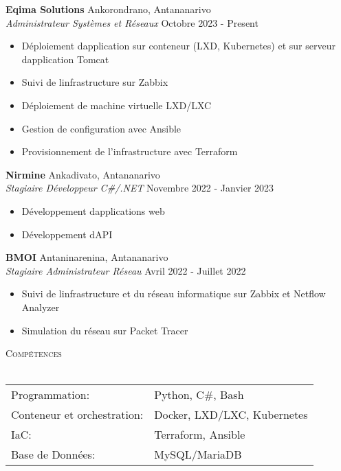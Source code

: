 \documentclass[a4paper]{article}
\newcommand{\lineunder} {
    \vspace*{-8pt} \\
    \hspace*{-18pt} \hrulefill \\
}
\newcommand{\header} [1] {
    {\hspace*{-18pt}\vspace*{6pt} \textsc{#1}}
    \vspace*{-6pt} \lineunder
}
\begin{document}
\textbf{Eqima Solutions} \hfill Ankorondrano, Antananarivo\\
\textit{Administrateur Systèmes et Réseaux} \hfill Octobre 2023 - Present\\
\vspace{-1mm}
\begin{itemize} \itemsep 1pt
	\item Déploiement d\textquotesingle{}application sur conteneur (LXD, Kubernetes) et sur serveur d\textquotesingle{}application Tomcat
	\item Suivi de l\textquotesingle{}infrastructure sur Zabbix
	\item Déploiement de machine virtuelle LXD/LXC
	\item Gestion de configuration avec Ansible
	\item Provisionnement de l’infrastructure avec Terraform
\end{itemize}
\textbf{Nirmine} \hfill Ankadivato, Antananarivo\\
\textit{Stagiaire Développeur C\#/.NET} \hfill Novembre 2022 - Janvier 2023\\
\vspace{-1mm}
\begin{itemize} \itemsep 1pt
	\item Développement d\textquotesingle{}applications web
	\item Développement d\textquotesingle{}API
\end{itemize}
\textbf{BMOI} \hfill Antaninarenina, Antananarivo\\
\textit{Stagiaire Administrateur Réseau} \hfill Avril 2022 - Juillet 2022\\
\vspace{-1mm}
\begin{itemize} \itemsep 1pt
	\item Suivi de l\textquotesingle{}infrastructure et du réseau informatique sur Zabbix et Netflow Analyzer
	\item Simulation du réseau sur Packet Tracer
\end{itemize}

\header{Compétences}
\begin{tabular}{ l l }
	Programmation:              & Python, C\#, Bash           \\
	Conteneur et orchestration: & Docker, LXD/LXC, Kubernetes \\
	IaC:                        & Terraform, Ansible          \\
	Base de Données:           & MySQL/MariaDB               \\
\end{tabular}
\vspace{2mm}
\end{document}
